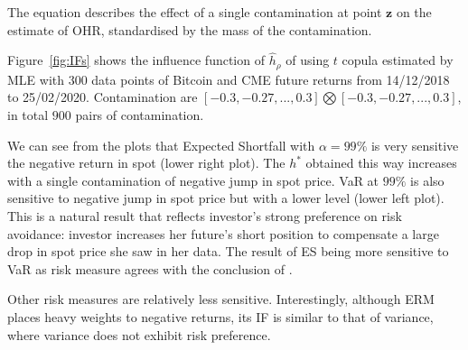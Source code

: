 
The equation describes the effect of a single contamination at point $\bm{z}$ on the estimate of OHR,
standardised by the mass of the contamination. \medskip

Figure~\ref{fig:IFs} shows the influence function of $\hat h_\rho$ of using $t$ copula estimated by MLE with 300 data points of
Bitcoin and CME future returns from 14/12/2018 to 25/02/2020.
Contamination are $[-0.3,-0.27,..., 0.3] \bigotimes [-0.3,-0.27,..., 0.3]$, in total $900$ pairs of contamination. \medskip

We can see from the plots that Expected Shortfall with $\alpha = 99\%$ is very sensitive the negative return in spot (lower right plot).
The $h^*$ obtained this way increases with a single contamination of negative jump in spot price.
VaR at $99\%$ is also sensitive to negative jump in spot price but with a lower level (lower left plot).
This is a natural result that reflects investor's strong preference on risk avoidance: investor increases her future's short position
to compensate a large drop in spot price she saw in her data.
The result of ES being more sensitive to VaR as risk measure agrees with the conclusion of \citet{cont2010robustness}. \medskip

Other risk measures are relatively less sensitive.
Interestingly, although ERM places heavy weights to negative returns,
its IF is similar to that of variance, where variance does not exhibit risk preference.


